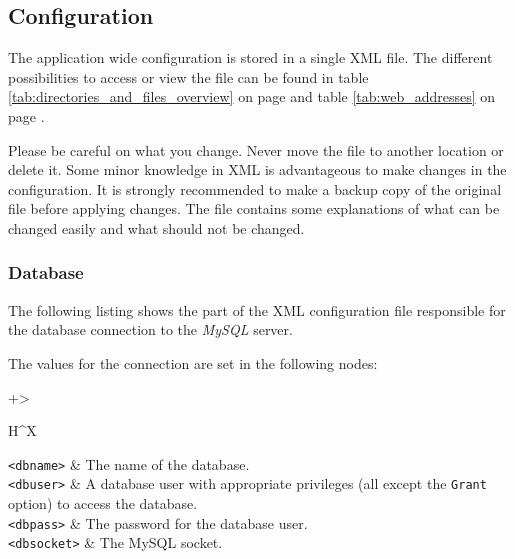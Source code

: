 \documentclass[a4paper,10pt,twoside,titlepage,headings=small,bibliography=totocnumbered,headsepline]{scrartcl}
\begin{document}
\begin{appendix}
\newpage
\subsection{Configuration}
\label{app:config} 

The application wide configuration is stored in a single \ac{XML} file. The different possibilities to access or view the file can be found in table \ref{tab:directories_and_files_overview} on page \pageref{tab:directories_and_files_overview} and table \ref{tab:web_addresses} on page \pageref{tab:web_addresses}.

Please be careful on what you change. Never move the file to another location or delete it. Some minor knowledge in XML is advantageous to make changes in the configuration. It is strongly recommended to make a backup copy of the original file before applying changes. The file contains some explanations of what can be changed easily and what should not be changed.

\numcodestyle
\lstset{language=XML}    

\subsubsection{Database}
\label{app:configdb}

The following listing shows the part of the XML configuration file responsible for the database connection to the \textit{MySQL} server. 



The values for the connection are set in the following nodes:

\begin{center} 
\begin{tabularx}{\textwidth}{+>{\raggedright\arraybackslash}H^X}
 \hline
\lstinline|<dbname>|	&	The name of the database. \\ \hline
\lstinline|<dbuser>|	&	A database user with appropriate privileges (all except the \lstinline|Grant| option) to access the database. \\ \hline
\lstinline|<dbpass>|	&	The password for the database user. \\ \hline
\lstinline|<dbsocket>|	&	The MySQL socket. \\ \hline
\end{tabularx}
\label{tab:database_config}
\end{center}


\end{appendix}
\end{document}
